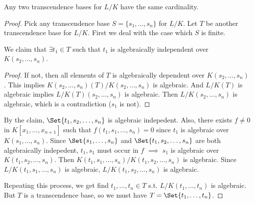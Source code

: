 \begin{theorem}
  Any two transcendence bases for $L/K$ have the same cardinality.

  \begin{proof}
    Pick any transcendence base $S = \{s_1, \dots, s_n\}$ for $L/K$.
    Let $T$ be another transcendence base for $L/K$.
    First we deal with the case which $S$ is finite.

    We claim that $\exists t_1 \in T$ such that
    $t_1$ is algebraically independent over $K(s_2, \dots, s_n)$.
    \begin{proof}
      If not, then all elements of $T$ is algebraically dependent over $K(s_2, \dots, s_n)$.
      This implies $K(s_2, \dots, s_n)(T) / K(s_2, \dots, s_n)$ is algebraic.
      And $L/K(T)$ is algebraic implies $L/K(T)(s_2,\dots,s_n)$ is algebraic.
      Then $L/K(s_2, \dots, s_n)$ is algebraic, which is a contradiction ($s_1$ is not).
    \end{proof}
    By the claim, $\Set{t_1, s_2, \dots, s_n}$ is algebraic indepedent.
    Also, there exists $f \ne 0$ in $K[x_1, \dots, x_{n+1}]$ such that
    $f(t_1, s_1, \dots, s_n) = 0$ since $t_1$ is algebraic over $K(s_1, \dots, s_n)$.
    Since $\Set{s_1, \dots, s_n}$ and $\Set{t_1, s_2, \dots, s_n}$ are both
    algebraically indepedent, $t_1, s_1$ must occur in $f$ $\implies$
    $s_1$ is algebraic over $K(t_1, s_2, \dots, s_n)$.
    Then $K(t_1, s_1, \dots, s_n) / K(t_1, s_2, \dots, s_n)$ is algebraic.
    Since $L/K(t_1, s_1, \dots, s_n)$ is algebraic, $L/K(t_1, s_2, \dots, s_n)$
    is algebraic.

    Repeating this process, we get find $t_1, \dots, t_n \in T$ s.t.
    $L/K(t_1, \dots, t_n)$ is algebraic. But $T$ is a transcendence base,
    so we must have $T = \Set{t_1, \dots, t_n}$.


\end{proof}
\end{theorem}
